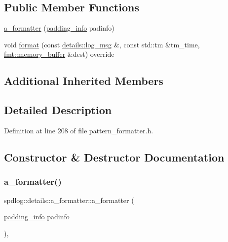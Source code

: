 \subsection*{Public Member Functions}
\begin{DoxyCompactItemize}
\item 
\hyperlink{classspdlog_1_1details_1_1a__formatter_a48d1f1eba77e826b69ff1e6eea389b63}{a\+\_\+formatter} (\hyperlink{structspdlog_1_1details_1_1padding__info}{padding\+\_\+info} padinfo)
\item 
void \hyperlink{classspdlog_1_1details_1_1a__formatter_a0dbb4322f91afd22b82fc0c0b20a35db}{format} (const \hyperlink{structspdlog_1_1details_1_1log__msg}{details\+::log\+\_\+msg} \&, const std\+::tm \&tm\+\_\+time, \hyperlink{format_8h_a21cbf729f69302f578e6db21c5e9e0d2}{fmt\+::memory\+\_\+buffer} \&dest) override
\end{DoxyCompactItemize}
\subsection*{Additional Inherited Members}


\subsection{Detailed Description}


Definition at line 208 of file pattern\+\_\+formatter.\+h.



\subsection{Constructor \& Destructor Documentation}
\mbox{\label{classspdlog_1_1details_1_1a__formatter_a48d1f1eba77e826b69ff1e6eea389b63}} 
\subsubsection{\texorpdfstring{a\+\_\+formatter()}{a\_formatter()}}
{\footnotesize\ttfamily spdlog\+::details\+::a\+\_\+formatter\+::a\+\_\+formatter (\begin{DoxyParamCaption}\item[{\hyperlink{structspdlog_1_1details_1_1padding__info}{padding\+\_\+info}}]{padinfo }\end{DoxyParamCaption})\hspace{0.3cm}{\ttfamily [inline]}, {\ttfamily [explicit]}}



